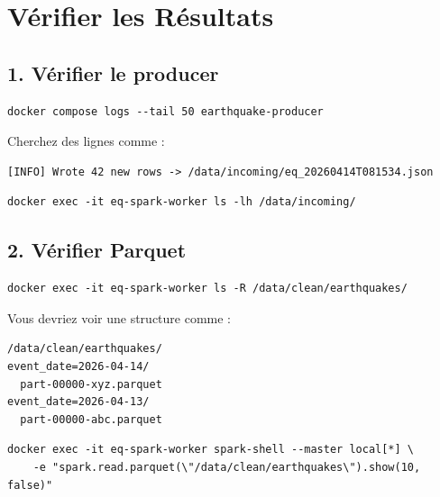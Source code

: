 \documentclass[12pt, a4paper]{article}
\begin{document}
\section{Vérifier les Résultats}

\subsection{1. Vérifier le producer}

\begin{lstlisting}[caption=Consulter les logs du producer]
docker compose logs --tail 50 earthquake-producer
\end{lstlisting}

Cherchez des lignes comme :

\begin{lstlisting}
[INFO] Wrote 42 new rows -> /data/incoming/eq_20260414T081534.json
\end{lstlisting}

\begin{lstlisting}[caption=Lister les fichiers produits]
docker exec -it eq-spark-worker ls -lh /data/incoming/
\end{lstlisting}

\subsection{2. Vérifier Parquet}

\begin{lstlisting}[caption=Lister la structure de Parquet]
docker exec -it eq-spark-worker ls -R /data/clean/earthquakes/
\end{lstlisting}

Vous devriez voir une structure comme :

\begin{lstlisting}
/data/clean/earthquakes/
event_date=2026-04-14/
  part-00000-xyz.parquet
event_date=2026-04-13/
  part-00000-abc.parquet
\end{lstlisting}

\begin{lstlisting}[caption=Lire les données Parquet avec Spark]
docker exec -it eq-spark-worker spark-shell --master local[*] \
    -e "spark.read.parquet(\"/data/clean/earthquakes\").show(10, false)"
\end{lstlisting}
\end{document}
